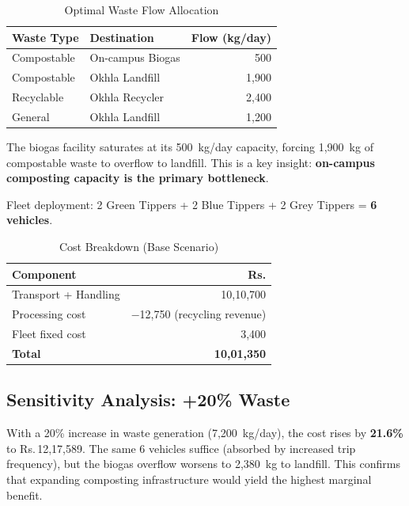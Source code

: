 \documentclass[11pt,a4paper]{article}
\begin{document}
\begin{table}[H]
\centering
\caption{Optimal Waste Flow Allocation}
\begin{tabular}{llr}
\toprule
\textbf{Waste Type} & \textbf{Destination} & \textbf{Flow (kg/day)} \\ \midrule
Compostable & On-campus Biogas & 500 \\
Compostable & Okhla Landfill   & 1,900 \\
Recyclable  & Okhla Recycler   & 2,400 \\
General     & Okhla Landfill   & 1,200 \\
\bottomrule
\end{tabular}
\end{table}

The biogas facility saturates at its 500~kg/day capacity, forcing 1,900~kg of compostable waste to overflow to landfill. This is a key insight: \textbf{on-campus composting capacity is the primary bottleneck}.

Fleet deployment: 2 Green Tippers + 2 Blue Tippers + 2 Grey Tippers = \textbf{6 vehicles}.

\begin{table}[H]
\centering
\caption{Cost Breakdown (Base Scenario)}
\begin{tabular}{lr}
\toprule
\textbf{Component} & \textbf{Rs.} \\ \midrule
Transport + Handling & 10,10,700 \\
Processing cost      & $-$12,750 (recycling revenue) \\
Fleet fixed cost     & 3,400 \\
\midrule
\textbf{Total}       & \textbf{10,01,350} \\
\bottomrule
\end{tabular}
\end{table}

\subsection{Sensitivity Analysis: +20\% Waste}

With a 20\% increase in waste generation (7,200~kg/day), the cost rises by \textbf{21.6\%} to Rs.\,12,17,589. The same 6 vehicles suffice (absorbed by increased trip frequency), but the biogas overflow worsens to 2,380~kg to landfill. This confirms that expanding composting infrastructure would yield the highest marginal benefit.

\end{document}
